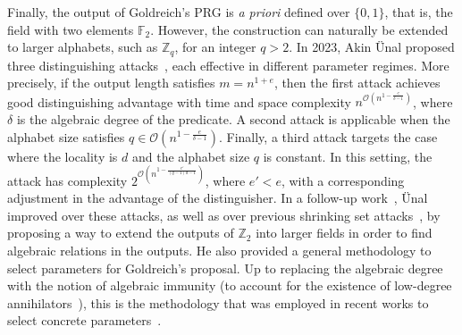 \documentclass[journal=tosc,submission]{iacrtrans}
\theoremstyle{theorem}
\newcommand\cb[1]{\textcolor{red!80}{\textbf{Christina:} #1}}
\newcommand\gc[1]{\textcolor{olive!80}{\textbf{Geoffroy:} #1}}
\newcommand\yr[1]{\textcolor{brown!80}{\textbf{Yann:} #1}}
\begin{document}
Finally, the output of Goldreich's PRG is \textit{a priori} defined over $\{0,1\}$, that is, the field with two elements $\mathbb{F}_2$. However, the construction can naturally be extended to larger alphabets, such as $\mathbb{Z}_q$, for an integer $q > 2$. In 2023, Akin Ünal proposed three distinguishing attacks~\cite{EC:Unal23}, each effective in different parameter regimes. More precisely, if the output length satisfies $m = n^{1+e}$, then the first attack achieves good distinguishing advantage with time and space complexity $n^{\mathcal{O}(n^{1 - \frac{e}{\delta - 1}})}$, where  $\delta$ is the algebraic degree of the predicate. A second attack is applicable when the alphabet size satisfies $q \in \mathcal{O}(n^{1 - \frac{e}{\delta - 1}})$. Finally, a third attack targets the case where the locality is $d$ and the alphabet size $q$ is constant. %
In this setting, the attack has complexity $2^{\mathcal{O}(n^{1 - \frac{e'}{(q - 1)d - 1}})}$, where $e' < e$, with a corresponding adjustment in the advantage of the distinguisher. In a follow-up work~\cite{EPRINT:Unal23b}, Ünal improved over these attacks, as well as over previous shrinking set attacks~\cite{applebaum2008pseudorandom,zichron2017locally}, by proposing a way to extend the outputs of $\mathbb{Z}_2$ into larger fields in order to find algebraic relations in the outputs. He also provided a general methodology to select parameters for Goldreich's proposal. Up to replacing the algebraic degree with the notion of algebraic immunity (to account for the existence of low-degree annihilators~\cite{STOC:AppLov16}), this is the methodology that was employed in recent works to select concrete parameters~\cite{EC:BCMPR24,AC:CDDKS24,DBLP:conf/eurocrypt/AgarwalBBS25}.


\end{document}
